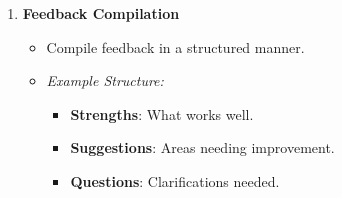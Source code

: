 \documentclass{beamer}
\begin{document}
\begin{frame}[fragile]
\begin{enumerate}
        \item \textbf{Feedback Compilation}
            \begin{itemize}
                \item Compile feedback in a structured manner.
                \item \textit{Example Structure:}
                    \begin{itemize}
                        \item \textbf{Strengths}: What works well.
                        \item \textbf{Suggestions}: Areas needing improvement.
                        \item \textbf{Questions}: Clarifications needed.
                    \end{itemize}
            \end{itemize}
    \end{enumerate}
\end{frame}
\end{document}
